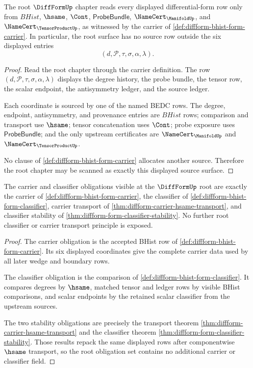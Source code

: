 \begin{theorem}
\label{thm:diffform-root-source-obligation}
The root $\DiffFormUp$ chapter reads every displayed differential-form row
only from $BHist$, $\hsame$, $\Cont$, $\mathsf{ProbeBundle}$,
$\NameCert_{\ManifoldUp}$, and $\NameCert_{\TensorProductUp}$, as witnessed by
the carrier of \autoref{def:diffform-bhist-form-carrier}. In particular, the
root surface has no source row outside the six displayed entries
$$
(d,\mathcal{P},\tau,\sigma,\alpha,\lambda).
$$
\end{theorem}
\begin{proof}
Read the root chapter through the carrier definition. The row
$(d,\mathcal{P},\tau,\sigma,\alpha,\lambda)$ displays the degree history, the
probe bundle, the tensor row, the scalar endpoint, the antisymmetry ledger,
and the source ledger.

Each coordinate is sourced by one of the named BEDC rows. The degree,
endpoint, antisymmetry, and provenance entries are $BHist$ rows; comparison
and transport use $\hsame$; tensor concatenation uses $\Cont$; probe exposure
uses $\mathsf{ProbeBundle}$; and the only upstream certificates are
$\NameCert_{\ManifoldUp}$ and $\NameCert_{\TensorProductUp}$.

No clause of \autoref{def:diffform-bhist-form-carrier} allocates another
source. Therefore the root chapter may be scanned as exactly this displayed
source surface.
\end{proof}

\begin{theorem}
\label{thm:diffform-root-carrier-classifier-obligation}
The carrier and classifier obligations visible at the $\DiffFormUp$ root are
exactly the carrier of \autoref{def:diffform-bhist-form-carrier}, the
classifier of \autoref{def:diffform-bhist-form-classifier}, carrier transport
of \autoref{thm:diffform-carrier-hsame-transport}, and classifier stability
of \autoref{thm:diffform-form-classifier-stability}. No further root
classifier or carrier transport principle is exposed.
\end{theorem}
\begin{proof}
The carrier obligation is the accepted BHist row of
\autoref{def:diffform-bhist-form-carrier}. Its six displayed coordinates give
the complete carrier data used by all later wedge and boundary rows.

The classifier obligation is the comparison of
\autoref{def:diffform-bhist-form-classifier}. It compares degrees by
$\hsame$, matched tensor and ledger rows by visible BHist comparisons, and
scalar endpoints by the retained scalar classifier from the upstream sources.

The two stability obligations are precisely the transport theorem
\autoref{thm:diffform-carrier-hsame-transport} and the classifier theorem
\autoref{thm:diffform-form-classifier-stability}. Those results repack the
same displayed rows after componentwise $\hsame$ transport, so the root
obligation set contains no additional carrier or classifier field.
\end{proof}

